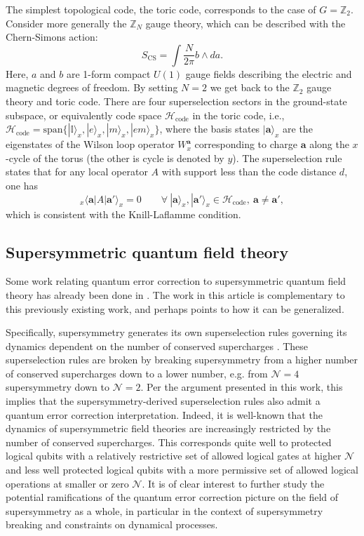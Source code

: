\documentclass[11pt,english]{article}
\newcommand{\bra}[1]{\langle #1|}
\newcommand{\ket}[1]{|#1\rangle}
\newcommand{\ZZ}{\mathbb{Z}}
\begin{document}
The simplest topological code, the toric code,  corresponds to the case of $G=\ZZ_2$. 
Consider more generally the $\ZZ_N$ gauge theory, which can be described with the Chern-Simons action:
\begin{equation}\label{eq:CS}
S_\text{CS} = \int  \frac{N}{2\pi} b \wedge da.
\end{equation}
Here, $a$ and $b$ are 1-form compact $U(1)$ gauge fields describing the electric and magnetic degrees of freedom.  By setting $N=2$ we get back to the $\ZZ_2$ gauge theory and toric code.   There are four superselection sectors in the ground-state subspace, or equivalently code space $\mathcal{H}_\text{code}$ in the toric code, i.e., 
$\mathcal{H}_\text{code}=\text{span}\{\ket{\mathbb{I}}_x, \ket{e}_x, \ket{m}_x, \ket{em}_x \}$, where the basis states $\ket{\mathbf{a}}_x$ are the eigenstates of the Wilson loop operator $W^{\mathbf{a}}_x$ corresponding to charge $\mathbf{a}$ along the $x$-cycle of the torus (the other is cycle is denoted by $y$).
The superselection rule states that for any local operator $A$ with support less than the code distance $d$, one has
\begin{equation}
    _x\bra{\mathbf{a}} A \ket{\mathbf{a}'}_x = 0 \qquad \forall ~ \ket{\mathbf{a}}_x, \ket{\mathbf{a'}}_x \in \mathcal{H}_\text{code},  ~ \mathbf{a} \neq \mathbf{a}',
\end{equation}
which is consistent with the Knill-Laflamme condition.


\subsection{Supersymmetric quantum field theory}
Some work relating quantum error correction to supersymmetric quantum field theory has already been done in \cite{Harvey_2020}. The work in this article is complementary to this previously existing work, and perhaps points to how it can be generalized.

Specifically, supersymmetry generates its own superselection rules governing its dynamics dependent on the number of conserved supercharges \cite{Tachikawa_2015, wess1992supersymmetry}. These superselection rules are broken by breaking supersymmetry from a higher number of conserved supercharges down to a lower number, e.g. from $\mathcal{N}=4$ supersymmetry down to $\mathcal{N}=2$. Per the argument presented in this work, this implies that the supersymmetry-derived superselection rules also admit a quantum error correction interpretation. Indeed, it is well-known that the dynamics of supersymmetric field theories are increasingly restricted by the number of conserved supercharges. This corresponds quite well  to protected logical qubits with a relatively restrictive set of allowed logical gates at higher $\mathcal{N}$ and less well protected logical qubits with a more permissive set of allowed logical operations at smaller or zero $\mathcal{N}$. It is of clear interest to further study the potential ramifications of the quantum error correction picture on the field of supersymmetry as a whole, in particular in the context of supersymmetry breaking and constraints on dynamical processes.
\end{document}
